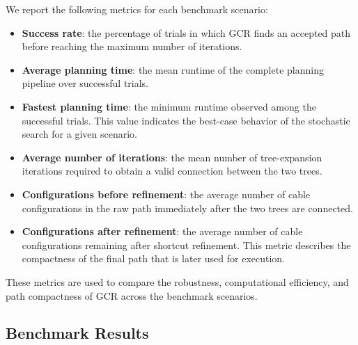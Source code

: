 \documentclass{pas}
\begin{document}

We report the following metrics for each benchmark scenario:
\begin{itemize}
    \item \textbf{Success rate}: the percentage of trials in which GCR finds an accepted path before reaching the maximum number of iterations.
    
    \item \textbf{Average planning time}: the mean runtime of the complete planning pipeline over successful trials.
    
    \item \textbf{Fastest planning time}: the minimum runtime observed among the successful trials. This value indicates the best-case behavior of the stochastic search for a given scenario.
    
    \item \textbf{Average number of iterations}: the mean number of tree-expansion iterations required to obtain a valid connection between the two trees.
    
    \item \textbf{Configurations before refinement}: the average number of cable configurations in the raw path immediately after the two trees are connected.

    \item \textbf{Configurations after refinement}: the average number of cable configurations remaining after shortcut refinement. This metric describes the compactness of the final path that is later used for execution.
\end{itemize}

These metrics are used to compare the robustness, computational efficiency, and path compactness of GCR across the benchmark scenarios.



\subsection{Benchmark Results}
\label{subsec:benchmark_results}
\end{document}
